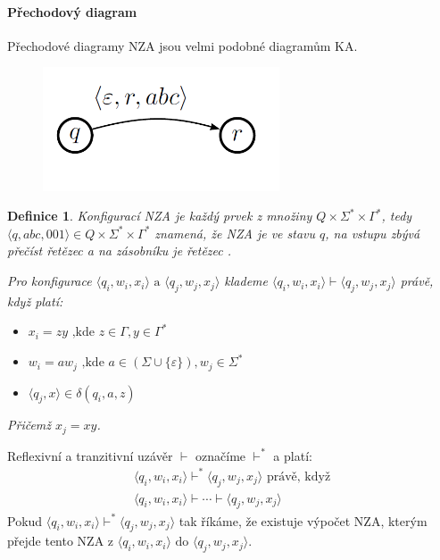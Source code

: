 \documentclass[10pt,a4paper]{article}
\theoremstyle{note}
\newtheorem{definice}{Definice}
\begin{document}
\paragraph{Přechodový diagram}
Přechodov\'e diagramy NZA jsou velmi podobn\'e diagramům KA.
\begin{center}
\begin{figure}[H]
\centering
\includegraphics[width=7cm]{img/ZA3.png}
\end{figure}
\end{center}

\begin{definice}
Konfigurac\'i NZA je každ\'y prvek z množiny $Q \times \Sigma^* \times \Gamma^*$, tedy
$\langle q, abc, 001 \rangle \in Q \times \Sigma^* \times \Gamma^*$ znamená, že NZA je ve stavu $q$, na vstupu
zbývá přečíst řetězec  a na zásobníku je řetězec .

Pro konfigurace $\langle q_i, w_i, x_i \rangle \text{ a } \langle q_j, w_j, x_j \rangle$ klademe 
$\langle q_i, w_i, x_i \rangle \vdash \langle q_j, w_j, x_j \rangle$ právě, když platí:
\begin{itemize}
\item
$x_i = zy \text{ ,kde } z \in \Gamma, y \in \Gamma^*$

\item
$w_i = aw_j \text{ ,kde } a \in (\Sigma \cup \lbrace \varepsilon \rbrace), w_j \in \Sigma^*$

\item
$\langle q_j, x \rangle \in \delta(q_i, a, z)$
\end{itemize}
Přičemž $x_j = xy$.
\end{definice}

Reflexivní a tranzitivní uzávěr $\vdash$ označíme $\vdash^*$ a platí:
\begin{gather*}
\langle q_i, w_i, x_i \rangle \vdash^* \langle q_j, w_j, x_j \rangle \text{ právě, když} \\
\langle q_i, w_i, x_i \rangle \vdash \cdots \vdash \langle q_j, w_j, x_j \rangle
\end{gather*}
Pokud $\langle q_i, w_i, x_i \rangle \vdash^* \langle q_j, w_j, x_j \rangle$ tak říkáme, že existuje výpočet
NZA, kterým přejde tento NZA z $\langle q_i, w_i, x_i \rangle \text{ do } \langle q_j, w_j, x_j \rangle$.
\end{document}
